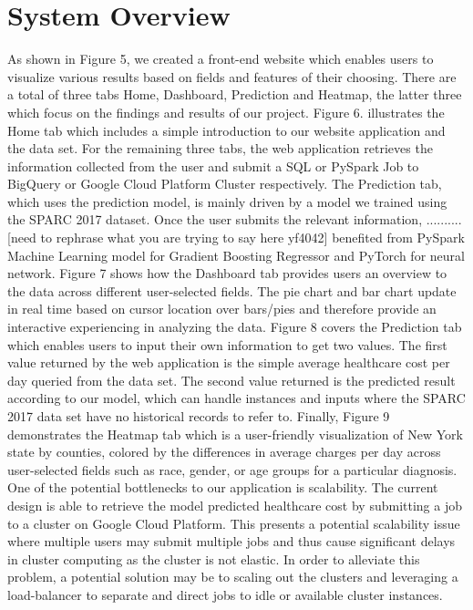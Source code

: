 \documentclass[10pt,twocolumn,letterpaper]{article}
\begin{document}
\section{System Overview}
As shown in Figure 5, we created a front-end website which enables users to visualize various results based on fields and features of their choosing. There are a total of three tabs Home, Dashboard, Prediction and Heatmap, the latter three which focus on the findings and results of our project. Figure 6. illustrates the Home tab which includes a simple introduction to our website application and the data set. For the remaining three tabs, the web application retrieves the information collected from the user and submit a SQL or PySpark Job to BigQuery or Google Cloud Platform Cluster respectively. The Prediction tab, which uses the prediction model, is mainly driven by a model we trained using the SPARC 2017 dataset. Once the user submits the relevant information, .......... [need to rephrase what you are trying to say here yf4042] benefited from PySpark Machine Learning model for Gradient Boosting Regressor and PyTorch for neural network. Figure 7 shows how the Dashboard tab provides users an overview to the data across different user-selected fields. The pie chart and bar chart update in real time based on cursor location over bars/pies and therefore provide an interactive experiencing in analyzing the data. Figure 8 covers the Prediction tab which enables users to input their own information to get two values. The first value returned by the web application is the simple average healthcare cost per day queried from the data set. The second value returned is the predicted result according to our model, which can handle instances and inputs where the SPARC 2017 data set have no historical records to refer to. Finally, Figure 9 demonstrates the Heatmap tab which is a user-friendly visualization of New York state by counties, colored by the differences in average charges per day across user-selected fields such as race, gender, or age groups for a particular diagnosis.
One of the potential bottlenecks to our application is scalability. The current design is able to retrieve the model predicted healthcare cost by submitting a job to a cluster on Google Cloud Platform. This presents a potential scalability issue where multiple users may submit multiple jobs and thus cause significant delays in cluster computing as the cluster is not elastic. In order to alleviate this problem, a potential solution may be to scaling out the clusters and leveraging a load-balancer to separate and direct jobs to idle or available cluster instances.
\end{document}
